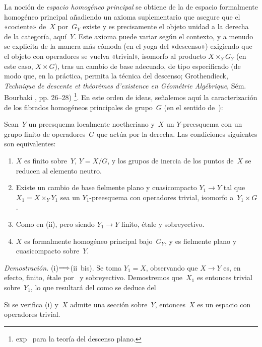 La
noción de \emph{espacio homogéneo principal}
%
se obtiene de la de espacio formalmente homogéneo principal añadiendo un
axioma suplementario que asegure que el «cociente» de~$X$ por~$G_Y$ existe y
es precisamente el objeto unidad a la derecha de la categoría, aquí~$Y$.
Este axioma puede variar según el contexto, y a menudo se explicita de la
manera más cómoda (en el yoga del «descenso») exigiendo que el objeto con
operadores se vuelva «trivial», \ie isomorfo al producto
$X\times_YG_Y$ (en este caso, $X\times G$), tras un cambio de base adecuado,
de tipo especificado (de modo que, en la práctica, permita la técnica del
descenso; \cf Grothendieck, \emph{Technique de descente et théorèmes
d'existence en Géométrie Algébrique}, Sém. Bourbaki , pp. 26--28)%
\footnote{\Cf exp\ptbl\  para la teoría del descenso plano.}.
En este orden de ideas, señalemos aquí la caracterización de los fibrados
homogéneos principales de grupo~$G$ (en el sentido de~\loccit):

\begin{proposition}
\label{V.2.6}
Sean~$Y$ un preesquema localmente noetheriano y~$X$ un $Y$-preesquema con un
grupo finito de operadores~$G$ que actúa por la derecha. Las condiciones
siguientes son equivalentes:
\begin{enumerate}
\item[(i)] $X$ es finito sobre~$Y$, $Y=X/G$, y los grupos de inercia de los
puntos de~$X$ se reducen al elemento neutro.
\item[(ii)] Existe un cambio de base fielmente plano y cuasicompacto
$Y_1\to Y$ tal que $X_1=X\times_YY_1$ sea un $Y_1$-preesquema con operadores
trivial, \ie isomorfo a~$Y_1\times G$.
\item[(ii~bis)] Como en (ii), pero siendo $Y_1\to Y$ finito, étale y
sobreyectivo.
\item[(iii)] $X$ es formalmente homogéneo principal bajo~$G_Y$, y es
fielmente plano y cuasicompacto sobre~$Y$.
\end{enumerate}
\end{proposition}
\textit{Demostración.} (i)$\Longrightarrow$(ii~bis). Se toma $Y_1=X$, observando que
$X\to Y$ es, en efecto, finito, étale por~ y sobreyectivo.
Demostremos que~$X_1$ es entonces trivial sobre~$Y_1$,
{lo que resultará del}
{como se deduce del}

\begin{corollaire}
\label{V.2.7}
Si se verifica \textup{(i)} y~$X$ admite una sección sobre~$Y$, entonces~$X$
es un espacio con operadores trivial.
\end{corollaire}

